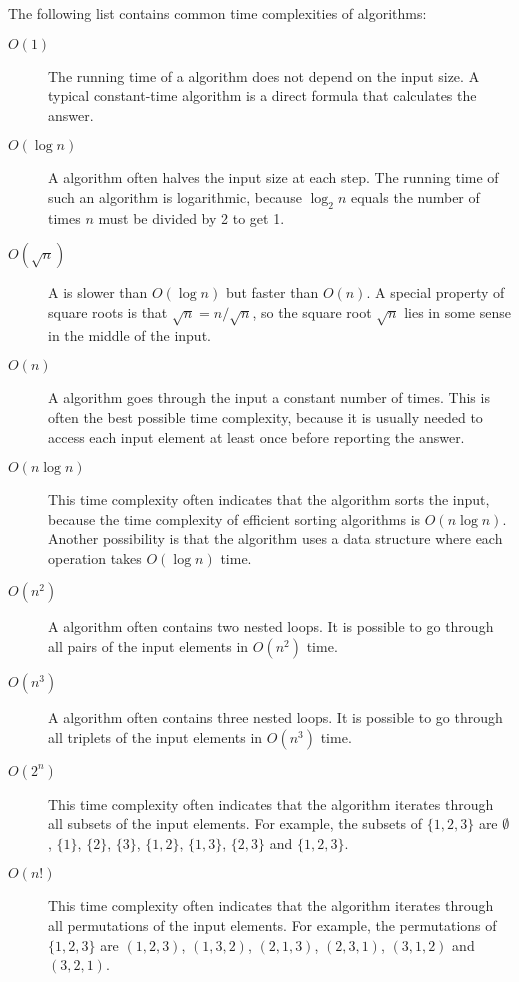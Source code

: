
The following list contains common time complexities
of algorithms:

\begin{description}
\item[$O(1)$]
The running time of a  algorithm
does not depend on the input size.
A typical constant-time algorithm is a direct
formula that calculates the answer.

\item[$O(\log n)$]
A  algorithm often halves
the input size at each step.
The running time of such an algorithm
is logarithmic, because
$\log_2 n$ equals the number of times
$n$ must be divided by 2 to get 1.

\item[$O(\sqrt n)$]
A  is slower than
$O(\log n)$ but faster than $O(n)$.
A special property of square roots is that
$\sqrt n = n/\sqrt n$, so the square root $\sqrt n$ lies
in some sense in the middle of the input.

\item[$O(n)$]
A  algorithm goes through the input
a constant number of times.
This is often the best possible time complexity,
because it is usually needed to access each
input element at least once before
reporting the answer.

\item[$O(n \log n)$]
This time complexity often indicates that the
algorithm sorts the input,
because the time complexity of efficient
sorting algorithms is $O(n \log n)$.
Another possibility is that the algorithm
uses a data structure where each operation
takes $O(\log n)$ time.

\item[$O(n^2)$]
A  algorithm often contains
two nested loops.
It is possible to go through all pairs of
the input elements in $O(n^2)$ time.

\item[$O(n^3)$]
A  algorithm often contains
three nested loops.
It is possible to go through all triplets of
the input elements in $O(n^3)$ time.

\item[$O(2^n)$]
This time complexity often indicates that
the algorithm iterates through all
subsets of the input elements.
For example, the subsets of $\{1,2,3\}$ are
$\emptyset$, $\{1\}$, $\{2\}$, $\{3\}$, $\{1,2\}$,
$\{1,3\}$, $\{2,3\}$ and $\{1,2,3\}$.

\item[$O(n!)$]
This time complexity often indicates that
the algorithm iterates through all
permutations of the input elements.
For example, the permutations of $\{1,2,3\}$ are
$(1,2,3)$, $(1,3,2)$, $(2,1,3)$, $(2,3,1)$,
$(3,1,2)$ and $(3,2,1)$.

\end{description}

